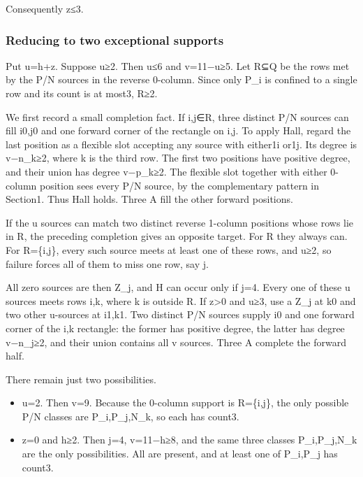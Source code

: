 \documentclass[
  10pt,
]{article}
\providecommand{\tightlist}{%
  \setlength{\itemsep}{0pt}\setlength{\parskip}{0pt}}
\begin{document}
Consequently z≤3.

\hypertarget{reducing-to-two-exceptional-supports}{%
\subsubsection*{Reducing to two exceptional
supports}\label{reducing-to-two-exceptional-supports}}

Put u=h+z. Suppose u≥2. Then u≤6 and v=11−u≥5. Let R⊆Q be the rows met
by the P/N sources in the reverse 0-column. Since only P\_i is confined
to a single row and its count is at most3, \textbar R\textbar≥2.

We first record a small completion fact. If i,j∈R, three distinct P/N
sources can fill i0,j0 and one forward corner of the rectangle on i,j.
To apply Hall, regard the last position as a flexible slot accepting any
source with either1i or1j. Its degree is v−n\_k≥2, where k is the third
row. The first two positions have positive degree, and their union has
degree v−p\_k≥2. The flexible slot together with either 0-column
position sees every P/N source, by the complementary pattern in
Section1. Thus Hall holds. Three A fill the other forward positions.

If the u sources can match two distinct reverse 1-column positions whose
rows lie in R, the preceding completion gives an opposite target. For
\textbar R they always can. For R=\{i,j\}, every such source
meets at least one of these rows, and u≥2, so failure forces all of them
to miss one row, say j.

All zero sources are then Z\_j, and H can occur only if j=4. Every one
of these u sources meets rows i,k, where k is outside R. If
z\textgreater0 and u≥3, use a Z\_j at k0 and two other u-sources at
i1,k1. Two distinct P/N sources supply i0 and one forward corner of the
i,k rectangle: the former has positive degree, the latter has degree
v−n\_j≥2, and their union contains all v sources. Three A complete the
forward half.

There remain just two possibilities.

\begin{itemize}
\tightlist
\item
  u=2. Then v=9. Because the 0-column support is R=\{i,j\}, the only
  possible P/N classes are P\_i,P\_j,N\_k, so each has count3.
\item
  z=0 and h≥2. Then j=4, v=11−h≥8, and the same three classes
  P\_i,P\_j,N\_k are the only possibilities. All are present, and at
  least one of P\_i,P\_j has count3.
\end{itemize}
\end{document}
